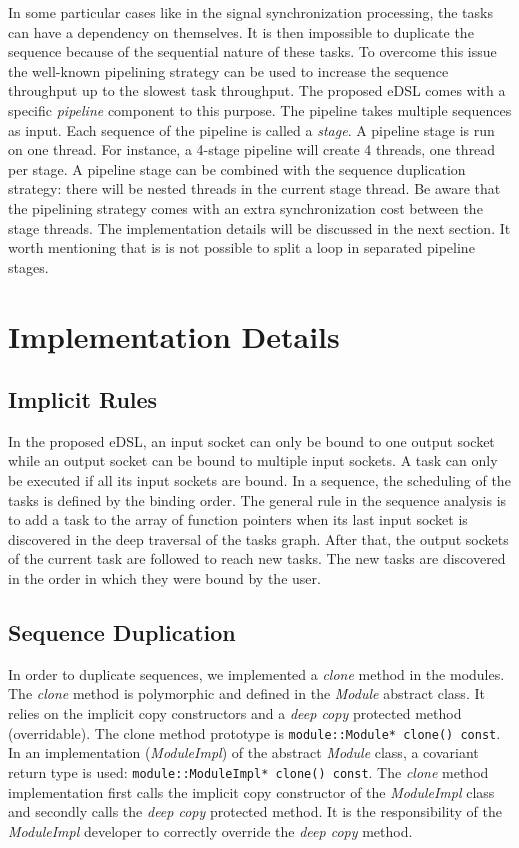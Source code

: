 In some particular cases like in the signal synchronization processing, the
tasks can have a dependency on themselves. It is then impossible to duplicate
the sequence because of the sequential nature of these tasks. To overcome this
issue the well-known pipelining strategy can be used to increase the sequence
throughput up to the slowest task throughput. The proposed eDSL comes with a
specific \emph{pipeline} component to this purpose. The pipeline takes multiple
sequences as input. Each sequence of the pipeline is called a \emph{stage}. A
pipeline stage is run on one thread. For instance, a 4-stage pipeline will
create 4 threads, one thread per stage. A pipeline stage can be combined with
the sequence duplication strategy: there will be nested threads in the current
stage thread. Be aware that the pipelining strategy comes with an extra
synchronization cost between the stage threads. The implementation details will
be discussed in the next section. It worth mentioning that is is not possible to
split a loop in separated pipeline stages.

\section{Implementation Details}

\subsection{Implicit Rules}

In the proposed eDSL, an input socket can only be bound to one output socket
while an output socket can be bound to multiple input sockets. A task can only
be executed if all its input sockets are bound. In a sequence, the scheduling of
the tasks is defined by the binding order. The general rule in the sequence
analysis is to add a task to the array of function pointers when its last input
socket is discovered in the deep traversal of the tasks graph. After that, the
output sockets of the current task are followed to reach new tasks. The new
tasks are discovered in the order in which they were bound by the user.

\subsection{Sequence Duplication}

In order to duplicate sequences, we implemented a \emph{clone} method in the
modules. The \emph{clone} method is polymorphic and defined in the \emph{Module}
abstract class. It relies on the implicit copy constructors and a \emph{deep
copy} protected method (overridable). The clone method prototype is
\verb|module::Module* clone() const|. In an implementation (\emph{ModuleImpl})
of the abstract \emph{Module} class, a covariant return type is used:
\verb|module::ModuleImpl* clone() const|. The \emph{clone} method implementation
first calls the implicit copy constructor of the \emph{ModuleImpl} class and
secondly calls the \emph{deep copy} protected method. It is the responsibility
of the \emph{ModuleImpl} developer to correctly override the \emph{deep copy}
method.

